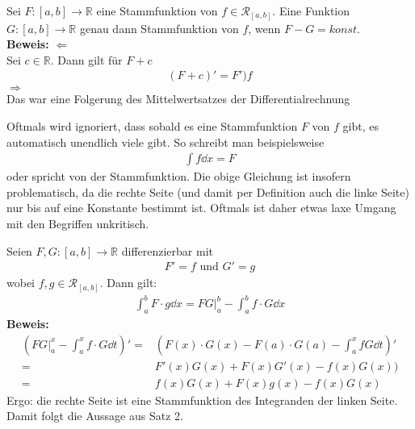 \begin{Proposition}{
	Sei $F: [a,b] \rightarrow \mathbb{R}$ eine Stammfunktion von $f \in \mathcal{R}
	_{[a,b]}$. Eine Funktion $G: [a,b] \rightarrow \mathbb{R}$ genau dann 
	Stammfunktion von $f$, wenn $F-G = konst.$\\
	\textbf{Beweis:} $\Leftarrow$ \\
	Sei $c \in \mathbb{R}$. Dann gilt für $F + c$ 
	\begin{align*}
		(F+ c)' = F' ) f
	\end{align*}
	$\Rightarrow$ \\
	Das war eine Folgerung des Mittelwertsatzes der Differentialrechnung %
}\end{Proposition}

\begin{Bemerkung}{
	Oftmals wird ignoriert, dass sobald es eine Stammfunktion $F$ von $f$ gibt, es 
	automatisch unendlich viele gibt. So schreibt man beispielsweise 
	\begin{align*}
		\int f \dd{x} = F
	\end{align*} 
	oder spricht von \glqq der\grqq{} Stammfunktion. Die obige Gleichung ist
	 insofern problematisch, da die rechte Seite (und damit per Definition auch die 
	 linke Seite) nur bis auf eine Konstante bestimmt ist. Oftmals ist daher etwas 
	 laxe Umgang mit den Begriffen unkritisch.
}\end{Bemerkung}

\begin{Satz}{
	Seien $F,G: [a,b] \rightarrow \mathbb{R}$ differenzierbar mit 
	\begin{align*}
		F' = f \text{ und } G' = g 
	\end{align*}
	wobei $f,g \in \mathcal{R}_{[a,b]}$. Dann gilt:
	\begin{align*}
		\int_a^b F \cdot g \dd{x} = FG\vert_a^b - \int_a^b f \cdot G \dd{x}
	\end{align*}
	\textbf{Beweis:}
	\begin{align*}
		\left( FG|_a^x - \int_a^x f \cdot G \dd{t} \right)' = &
		\left(F(x) \cdot G(x) - F(a) \cdot G(a) - \int_a^x fG \dd{t} \right)' \\
		= & F'(x)G(x) + F(x)G'(x) - f(x)G(x)) \\
		= & f(x)G(x) + F(x)g(x) -f(x)G(x)
	\end{align*}
	Ergo: die rechte Seite ist eine Stammfunktion des Integranden der 
	linken Seite. Damit folgt die Aussage aus Satz 2. %
}\end{Satz}

